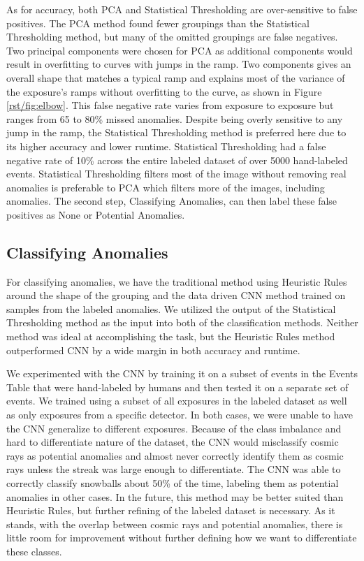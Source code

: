 As for accuracy, both PCA and Statistical Thresholding are over-sensitive to false positives.
The PCA method found fewer groupings than the Statistical Thresholding method, but many of the omitted groupings are false negatives.
Two principal components were chosen for PCA as additional components would result in overfitting to curves with jumps in the ramp.
Two components gives an overall shape that matches a typical ramp and explains most of the variance of the exposure's ramps without overfitting to the curve, as shown in Figure \ref{rst/fig:elbow}.
This false negative rate varies from exposure to exposure but ranges from 65 to 80\% missed anomalies. 
Despite being overly sensitive to any jump in the ramp, the Statistical Thresholding method is preferred here due to its higher accuracy and lower runtime.
Statistical Thresholding had a false negative rate of 10\% across the entire labeled dataset of over 5000 hand-labeled events. 
Statistical Thresholding filters most of the image without removing real anomalies is preferable to PCA which filters more of the images, including anomalies. 
The second step, Classifying Anomalies, can then label these false positives as None or Potential Anomalies. 

\subsection{Classifying Anomalies}
For classifying anomalies, we have the traditional method using Heuristic Rules around the shape of the grouping and the data driven CNN method trained on samples from the labeled anomalies. 
We utilized the output of the Statistical Thresholding method as the input into both of the classification methods. 
Neither method was ideal at accomplishing the task, but the Heuristic Rules method outperformed CNN by a wide margin in both accuracy and runtime.

We experimented with the CNN by training it on a subset of events in the Events Table that were hand-labeled by humans and then tested it on a separate set of events. 
We trained using a subset of all exposures in the labeled dataset as well as only exposures from a specific detector.
In both cases, we were unable to have the CNN generalize to different exposures. 
Because of the class imbalance and hard to differentiate nature of the dataset, the CNN would misclassify cosmic rays as potential anomalies and almost never correctly identify them as cosmic rays unless the streak was large enough to differentiate. 
The CNN was able to correctly classify snowballs about 50\% of the time, labeling them as potential anomalies in other cases. 
In the future, this method may be better suited than Heuristic Rules, but further refining of the labeled dataset is necessary.
As it stands, with the overlap between cosmic rays and potential anomalies, there is little room for improvement without further defining how we want to differentiate these classes.

